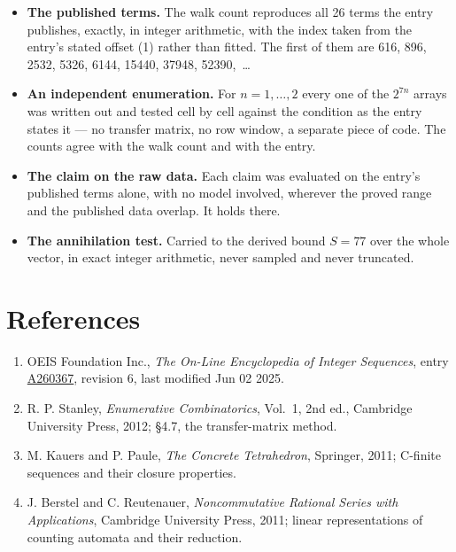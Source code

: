 \documentclass[11pt]{article}
\theoremstyle{definition}
\begin{document}
\begin{itemize}

\item {\bfseries The published terms.} The walk count reproduces all 26 terms the entry publishes, exactly, in integer arithmetic, with the index taken from the entry's stated offset (1) rather than fitted. The first of them are 616, 896, 2532, 5326, 6144, 15440, 37948, 52390,~\dots

\item {\bfseries An independent enumeration.} For $n = 1,\dots,2$ every one of the $2^{7n}$ arrays was written out and tested cell by cell against the condition as the entry states it --- no transfer matrix, no row window, a separate piece of code. The counts agree with the walk count and with the entry.

\item {\bfseries The claim on the raw data.} Each claim was evaluated on the entry's published terms alone, with no model involved, wherever the proved range and the published data overlap. It holds there.

\item {\bfseries The annihilation test.} Carried to the derived bound $S = 77$ over the whole vector, in exact integer arithmetic, never sampled and never truncated.

\end{itemize}

\section{References}

\begin{enumerate}

\item OEIS Foundation Inc., \emph{The On-Line Encyclopedia of Integer Sequences}, entry \href{https://oeis.org/A260367}{A260367}, revision 6, last modified Jun 02 2025.

\item R. P. Stanley, \emph{Enumerative Combinatorics}, Vol.~1, 2nd ed., Cambridge University Press, 2012; \S4.7, the transfer-matrix method.

\item M. Kauers and P. Paule, \emph{The Concrete Tetrahedron}, Springer, 2011; C-finite sequences and their closure properties.

\item J. Berstel and C. Reutenauer, \emph{Noncommutative Rational Series with Applications}, Cambridge University Press, 2011; linear representations of counting automata and their reduction.

\end{enumerate}
\end{document}
